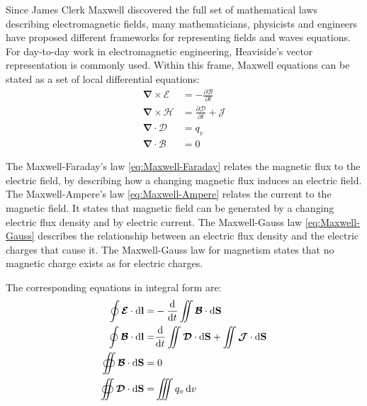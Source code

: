 Since James Clerk Maxwell discovered the full set of mathematical laws describing electromagnetic fields, many mathematicians, physicists and engineers have proposed different frameworks for representing fields and waves equations\parencite{Lindell2004, Warnick2014}. For day-to-day work in electromagnetic engineering, Heaviside's vector representation is commonly used. Within this frame,  Maxwell equations can be stated as a set of local differential equations:
\begin{subequations}
 \begin{align}
  \boldsymbol{\nabla} \times \boldsymbol{\mathcal{E}} &= -\frac{\partial \boldsymbol{\mathcal{B}}}{\partial t} \label{eq:Maxwell-Faraday}\\
  \boldsymbol{\nabla} \times \boldsymbol{\mathcal{H}} &= \frac{\partial \boldsymbol{\mathcal{D}}}{\partial t} + \boldsymbol{\mathcal{J}} \label{eq:Maxwell-Ampere} \\
  \boldsymbol{\nabla} \cdot \boldsymbol{\mathcal{D}} &= q_v \label{eq:Maxwell-Gauss} \\
  \boldsymbol{\nabla} \cdot \boldsymbol{\mathcal{B}} &= 0 \label{eq:Maxwell-Gauss-Magnetism}
 \end{align}
 \label{eq:MaxwellEquations}
\end{subequations} 

The Maxwell-Faraday's law \ref{eq:Maxwell-Faraday} relates the magnetic flux to the electric field, by describing how a changing magnetic flux induces an electric field.
The Maxwell-Ampere's law \ref{eq:Maxwell-Ampere} relates the current to the magnetic field. It states that magnetic field can be generated by a changing electric flux density and by electric current. 
The Maxwell-Gauss law \ref{eq:Maxwell-Gauss} describes the relationship between an electric flux density and the electric charges that cause it. 
The Maxwell-Gauss law for magnetism states that no magnetic charge exists as for electric charges.

The corresponding equations in integral form are:
\begin{subequations}
	\begin{align}
	\oint \boldsymbol{\mathcal{E}} \cdot \diff \mathbf{l} 
	=&
		- \frac{\diff }{\diff t} \iint \boldsymbol{\mathcal{B}} \cdot \diff \mathbf{S} 
		\\
		\oint \boldsymbol{\mathcal{B}} \cdot \diff \mathbf{l} 
		=&
		\frac{\diff }{\diff t} \iint \boldsymbol{\mathcal{D}} \cdot \diff \mathbf{S} 	
		+ \iint \boldsymbol{\mathcal{J}} \cdot \diff \mathbf{S} 
		\\
		\oiint \boldsymbol{\mathcal{B}} \cdot \diff \mathbf{S} 
		=& \; 0
		\\
		\oiint \boldsymbol{\mathcal{D}} \cdot \diff \mathbf{S} 
		=& 
		\iiint q_v \diff v			
	\end{align}
	\label{eq:MaxwellEquationsIntegral}
\end{subequations}

